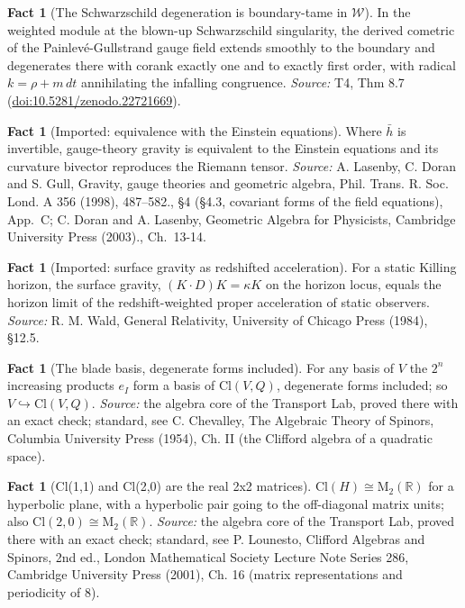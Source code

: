 \documentclass[11pt]{article}
\theoremstyle{definition}
\newtheorem{fact}[theorem]{Fact}
\theoremstyle{plain}
\providecommand{\Cl}{}\renewcommand{\Cl}{\mathrm{Cl}}
\providecommand{\Mat}{}\renewcommand{\Mat}{\mathrm{M}}
\providecommand{\R}{}\renewcommand{\R}{\mathbb{R}}
\providecommand{\dtPG}{}\renewcommand{\dtPG}{dt}
\providecommand{\hb}{}\renewcommand{\hb}{\bar{h}}
\providecommand{\shW}{}\renewcommand{\shW}{\mathcal{W}}
\begin{document}
\begin{fact}[The Schwarzschild degeneration is boundary-tame in $\shW$]\label{c:sheaf.schwarzschild-degeneration-boundary-tame}
In the weighted module at the blown-up Schwarzschild singularity, the derived cometric of the Painlev\'e-Gullstrand gauge field extends smoothly to the boundary and degenerates there with corank exactly one and to exactly first order, with radical $k = \rho + m\,\dtPG$ annihilating the infalling congruence.
\emph{Source:} T4, Thm 8.7 (\href{https://doi.org/10.5281/zenodo.22721669}{doi:10.5281/zenodo.22721669}).
\end{fact}

\begin{fact}[Imported: equivalence with the Einstein equations]\label{c:singularity.imported-equivalence-einstein-equations}
Where $\hb$ is invertible, gauge-theory gravity is equivalent to the Einstein equations and its curvature bivector reproduces the Riemann tensor.
\emph{Source:} A. Lasenby, C. Doran and S. Gull, Gravity, gauge theories and geometric algebra, Phil. Trans. R. Soc. Lond. A 356 (1998), 487--582., \S 4 (\S 4.3, covariant forms of the field equations), App.~C; C. Doran and A. Lasenby, Geometric Algebra for Physicists, Cambridge University Press (2003)., Ch.~13-14.
\end{fact}

\begin{fact}[Imported: surface gravity as redshifted acceleration]\label{c:singularity.imported-surface-gravity-redshifted-acceleration}
For a static Killing horizon, the surface gravity, $(K \cdot D)K = \kappa K$ on the horizon locus, equals the horizon limit of the redshift-weighted proper acceleration of static observers.
\emph{Source:} R. M. Wald, General Relativity, University of Chicago Press (1984), §12.5.
\end{fact}

\begin{fact}[The blade basis, degenerate forms included]\label{c:std-algebra.blade-basis}
For any basis of $V$ the $2^{n}$ increasing products $e_I$ form a basis of $\Cl(V, Q)$, degenerate forms included; so $V \hookrightarrow \Cl(V, Q)$.
\emph{Source:} the algebra core of the Transport Lab, proved there with an exact check; standard, see C. Chevalley, The Algebraic Theory of Spinors, Columbia University Press (1954), Ch. II (the Clifford algebra of a quadratic space).
\end{fact}

\begin{fact}[Cl(1,1) and Cl(2,0) are the real 2x2 matrices]\label{c:std-algebra.cl11-matrix}
$\Cl(H) \cong \Mat_2(\R)$ for a hyperbolic plane, with a hyperbolic pair going to the off-diagonal matrix units; also $\Cl(2,0) \cong \Mat_2(\R)$.
\emph{Source:} the algebra core of the Transport Lab, proved there with an exact check; standard, see P. Lounesto, Clifford Algebras and Spinors, 2nd ed., London Mathematical Society Lecture Note Series 286, Cambridge University Press (2001), Ch. 16 (matrix representations and periodicity of 8).
\end{fact}
\end{document}
